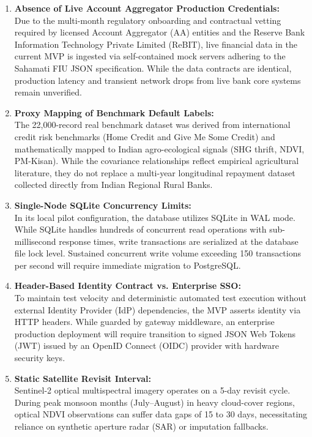 \begin{enumerate}
  \item \textbf{Absence of Live Account Aggregator Production Credentials:}\\
  Due to the multi-month regulatory onboarding and contractual vetting required by licensed Account Aggregator (AA) entities and the Reserve Bank Information Technology Private Limited (ReBIT), live financial data in the current MVP is ingested via self-contained mock servers adhering to the Sahamati FIU JSON specification. While the data contracts are identical, production latency and transient network drops from live bank core systems remain unverified.

  \item \textbf{Proxy Mapping of Benchmark Default Labels:}\\
  The 22,000-record real benchmark dataset was derived from international credit risk benchmarks (Home Credit and Give Me Some Credit) and mathematically mapped to Indian agro-ecological signals (SHG thrift, NDVI, PM-Kisan). While the covariance relationships reflect empirical agricultural literature, they do not replace a multi-year longitudinal repayment dataset collected directly from Indian Regional Rural Banks.

  \item \textbf{Single-Node SQLite Concurrency Limits:}\\
  In its local pilot configuration, the database utilizes SQLite in WAL mode. While SQLite handles hundreds of concurrent read operations with sub-millisecond response times, write transactions are serialized at the database file lock level. Sustained concurrent write volume exceeding 150 transactions per second will require immediate migration to PostgreSQL.

  \item \textbf{Header-Based Identity Contract vs. Enterprise SSO:}\\
  To maintain test velocity and deterministic automated test execution without external Identity Provider (IdP) dependencies, the MVP asserts identity via HTTP headers. While guarded by gateway middleware, an enterprise production deployment will require transition to signed JSON Web Tokens (JWT) issued by an OpenID Connect (OIDC) provider with hardware security keys.

  \item \textbf{Static Satellite Revisit Interval:}\\
  Sentinel-2 optical multispectral imagery operates on a 5-day revisit cycle. During peak monsoon months (July--August) in heavy cloud-cover regions, optical NDVI observations can suffer data gaps of 15 to 30 days, necessitating reliance on synthetic aperture radar (SAR) or imputation fallbacks.
\end{enumerate}
